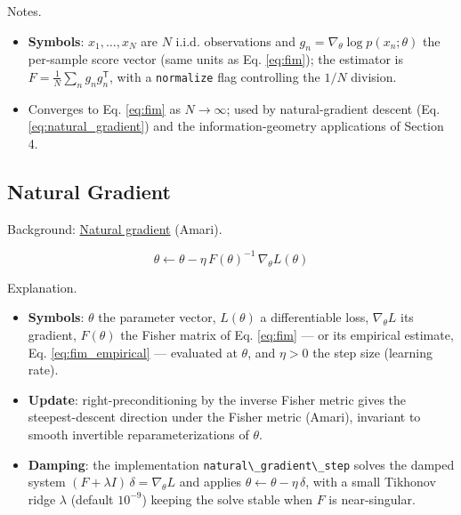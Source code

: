 \documentclass[
  10pt,
]{article}
\newcommand{\passthrough}[1]{#1}
\providecommand{\tightlist}{%
  \setlength{\itemsep}{0pt}\setlength{\parskip}{0pt}}
\begin{document}
Notes.

\begin{itemize}
\tightlist
\item
  \textbf{Symbols}: \(x_1, \ldots, x_N\) are \(N\) i.i.d. observations
  and \(g_n = \nabla_\theta \log p(x_n;\theta)\) the per-sample score
  vector (same units as Eq. \eqref{eq:fim}); the estimator is
  \(F = \tfrac{1}{N} \sum_n g_n g_n^{\mathsf{T}}\), with a
  \passthrough{\lstinline!normalize!} flag controlling the \(1/N\)
  division.
\item
  Converges to Eq. \eqref{eq:fim} as \(N \to \infty\); used by
  natural-gradient descent (Eq. \eqref{eq:natural_gradient}) and the
  information-geometry applications of Section 4.
\end{itemize}

\subsection{Natural Gradient}\label{eq:natgrad}

Background:
\href{https://en.wikipedia.org/wiki/Natural_gradient}{Natural gradient}
(Amari).

\begin{equation}\label{eq:natural_gradient}
\theta \leftarrow \theta - \eta\, F(\theta)^{-1}\, \nabla_{\theta} L(\theta)
\end{equation}

Explanation.

\begin{itemize}
\tightlist
\item
  \textbf{Symbols}: \(\theta\) the parameter vector, \(L(\theta)\) a
  differentiable loss, \(\nabla_\theta L\) its gradient, \(F(\theta)\)
  the Fisher matrix of Eq. \eqref{eq:fim} --- or its empirical estimate,
  Eq. \eqref{eq:fim_empirical} --- evaluated at \(\theta\), and
  \(\eta > 0\) the step size (learning rate).
\item
  \textbf{Update}: right-preconditioning by the inverse Fisher metric
  gives the steepest-descent direction under the Fisher metric (Amari),
  invariant to smooth invertible reparameterizations of \(\theta\).
\item
  \textbf{Damping}: the implementation
  \passthrough{\lstinline!natural\_gradient\_step!} solves the damped
  system \((F + \lambda I)\,\delta = \nabla_\theta L\) and applies
  \(\theta \leftarrow \theta - \eta\,\delta\), with a small Tikhonov
  ridge \(\lambda\) (default \(10^{-9}\)) keeping the solve stable when
  \(F\) is near-singular.
\end{itemize}
\end{document}
